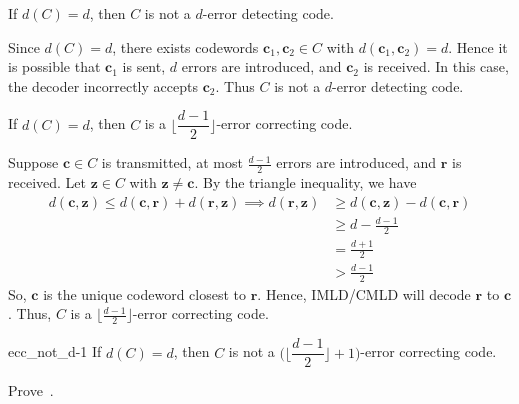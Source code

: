 \begin{Theorem}{}{}
    If $ d(C)=d $, then $ C $ is not a $ d $-error detecting code.
\end{Theorem}

\begin{Proof}{}{}
    Since $ d(C)=d $, there exists codewords $ \symbf{c}_1,\symbf{c}_2\in C $
    with $ d(\symbf{c}_1,\symbf{c}_2)=d $. Hence it is possible that
    $ \symbf{c}_1 $ is sent, $ d $ errors are introduced, and $ \symbf{c}_2 $
    is received. In this case, the decoder incorrectly accepts
    $ \symbf{c}_2 $. Thus $ C $ is not a $ d $-error detecting code.
\end{Proof}

\begin{Theorem}{}{}
    If $ d(C)=d $, then $ C $ is a $ \biggr\lfloor \dfrac{d-1}{2}\biggl\rfloor $-error
    correcting code.
\end{Theorem}

\begin{Proof}{}{}
    Suppose $ \symbf{c}\in C $ is transmitted, at most $ \frac{d-1}{2}  $ errors
    are introduced, and $ \symbf{r} $ is received.
    Let $ \symbf{z}\in C $ with $ \symbf{z}\neq \symbf{c} $.
    By the triangle inequality, we have
    \begin{align*}
        d(\symbf{c},\symbf{z})\leqslant d(\symbf{c},\symbf{r})+d(\symbf{r},\symbf{z})\implies
        d(\symbf{r},\symbf{z})
         & \geqslant d(\symbf{c},\symbf{z})-d(\symbf{c},\symbf{r}) \\
         & \geqslant d-\frac{d-1}{2}                               \\
         & =\frac{d+1}{2}                                          \\
         & >\frac{d-1}{2}
    \end{align*}
    So, $ \symbf{c} $ is the unique codeword closest to $ \symbf{r} $. Hence, IMLD/CMLD
    will decode $ \symbf{r} $ to $ \symbf{c} $. Thus, $ C $ is a
    $ \bigl\lfloor \frac{d-1}{2} \bigr\rfloor $-error correcting code.
\end{Proof}

\begin{Theorem}{}{ecc_not_d-1}
    If $ d(C)=d $, then $ C $ is not a $ \biggl(\biggr\lfloor \dfrac{d-1}{2}\biggl\rfloor +1 \biggr) $-error correcting code.
\end{Theorem}

\begin{Exercise}{}{}
    Prove~.
\end{Exercise}

